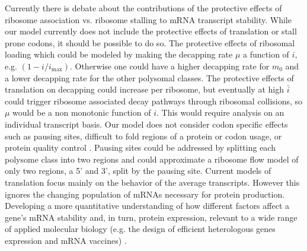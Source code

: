 \documentclass[a4,center,fleqn]{NAR}
\newcommand{\imax}{\ensuremath{{i_{\max}}}\xspace}
\newcommand{\MRL}{\ensuremath{\bar{i}}\xspace}
\begin{document}
Currently there is debate about the contributions of the protective effects of ribosome association vs. ribosome stalling to mRNA transcript stability.
While our model currently does not include the protective effects of translation or stall prone codons, it should be possible to do so.
The protective effects of ribosomal loading which could be modeled by making the decapping rate $\mu $ a function of $i$, e.g. $(1-i/\imax)$. Otherwise one could have a higher decapping rate for $m_0$ and a lower decapping rate for the other polysomal classes.
The protective effects of translation on decapping could increase per ribosome, but eventually at high \MRL could trigger ribosome associated decay pathways through ribosomal collisions, so $\mu$ would be a non monotonic function of $i$. This would require analysis on an individual transcript basis.
Our model does not consider codon specific effects such as pausing sites, difficult to fold regions of a protein or codon usage, or protein quality control \citep{RN39}.
Pausing sites could be addressed by splitting each polysome class into two regions and could approximate a ribosome flow model of only two regions, a 5' and 3', split by the pausing site. Current models of translation focus mainly on the behavior of the average transcripts. However this ignores the changing population of mRNAs necessary for protein production. 
Developing a more quantitative understanding of how different factors affect a gene's mRNA stability and, in turn, protein expression, relevant to a wide range of applied molecular biology (e.g. the design of efficient heterologous genes expression and mRNA vaccines) \citep{RN40}.
\end{document}
